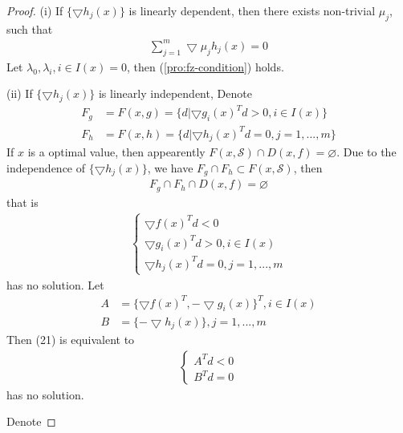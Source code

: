 \begin{proof}
    (i) If $\{\bigtriangledown h_j (x)\}$ is linearly dependent,
    then there exists non-trivial $\mu_j$, such that
    \begin{align}
        \sum_{j=1}^m \bigtriangledown \mu_jh_j (x) = 0
    \end{align}
    Let $\lambda_0, \lambda_i, i \in I(x) = 0$, then (\ref{pro:fz-condition}) holds.
    \par
    (ii) If $\{\bigtriangledown h_j (x)\}$ is linearly independent,
    Denote
    \begin{align}
        F_g &= F(x, g) = \{ d | \bigtriangledown g_i(x)^Td > 0, i \in I(x)\} \\
        F_h &= F(x, h) = \{ d | \bigtriangledown h_j(x)^Td = 0, j = 1,...,m\}
    \end{align}
    If $x$ is a optimal value, then appearently 
    $F(x, \mathcal{S}) \cap D(x, f) = \varnothing$.
    Due to the independence of $\{\bigtriangledown h_j (x)\}$,
    we have {\color{red}$F_g \cap F_h \subset F(x, \mathcal{S})$},
    then 
    \begin{align}
        F_g \cap F_h \cap D(x, f) = \varnothing
    \end{align}
    that is
    \begin{align}
        \left\{
        \begin{array}{ll}
            \bigtriangledown f(x)^Td < 0 \\
            \bigtriangledown g_i(x)^Td > 0, i \in I(x) \\
            \bigtriangledown h_j (x)^Td  =0, j = 1,...,m
        \end{array}
        \right.
    \end{align}
    has no solution.
    Let 
    \begin{align}
        A &= \{ \bigtriangledown f(x)^T, -\bigtriangledown g_i(x)\}^T, i \in I(x) \\
        B &= \{ -\bigtriangledown h_j(x)\}, j = 1,...,m
    \end{align}
    Then (21) is equivalent to
    \begin{align}
        \left\{
        \begin{array}{ll}
            A^T d < 0 \\
            B^T d = 0
        \end{array}
        \right.
    \end{align}
    has no solution.
    \par
    \noindent
    Denote

\end{proof}
